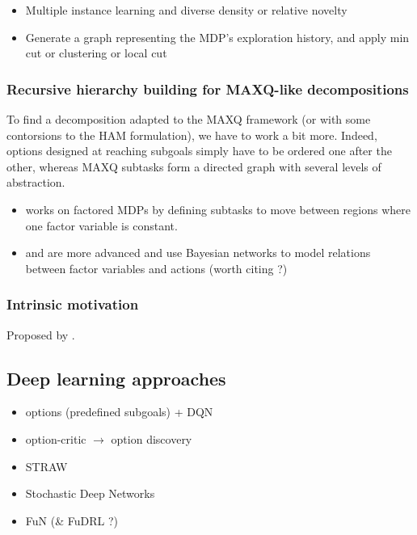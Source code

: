 \documentclass{article}
\begin{document}
\begin{itemize}
    \item Multiple instance learning and diverse density \cite{mcgovern_automatic_2001} or relative novelty  \cite{simsek_using_2004}
    \item Generate a graph representing the MDP's exploration history, and apply min cut \cite{goos_q-cutdynamic_2002} or clustering \cite{mannor_dynamic_2004} or local cut \cite{simsek_identifying_2005}
\end{itemize}

\subsubsection{Recursive hierarchy building for MAXQ-like decompositions}

To find a decomposition adapted to the MAXQ framework (or with some contorsions to the HAM formulation), we have to work a bit more. Indeed, options designed at reaching subgoals simply have to be ordered one after the other, whereas MAXQ subtasks form a directed graph with several levels of abstraction. 

\begin{itemize}
    \item \cite{hengst_discovering_2002} works on factored MDPs by defining subtasks to move between regions where one factor variable is constant.
    \item \cite{jonsson_causal_2006} and \cite{mehta_automatic_2008} are more advanced and use Bayesian networks to model relations between factor variables and actions (worth citing ?)
\end{itemize}

\subsubsection{Intrinsic motivation}

Proposed by \cite{chentanez_intrinsically_2005}.

\subsection{Deep learning approaches}

\begin{itemize}
    \item options (predefined subgoals) + DQN \cite{kulkarni_hierarchical_2016}
    \item option-critic \cite{bacon_option-critic_2016} $\rightarrow$ option discovery
    \item STRAW \cite{alexander_strategic_2016}
    \item Stochastic Deep Networks \cite{florensa_stochastic_2017}
    \item FuN \cite{vezhnevets_feudal_2017} (\& FuDRL \cite{casanueva_feudal_2018} ?)
\end{itemize}
\end{document}
